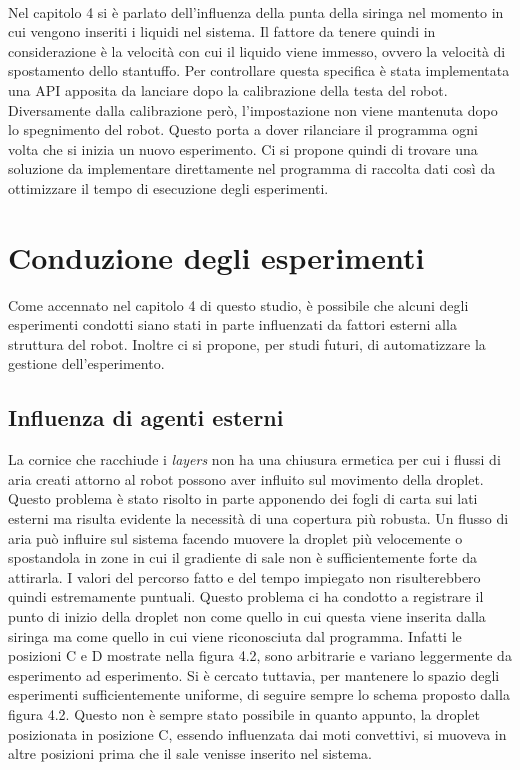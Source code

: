 \\Nel capitolo 4 si è parlato dell'influenza della punta della siringa nel momento in cui vengono inseriti i liquidi nel sistema. Il fattore da tenere quindi in considerazione è la velocità con cui il liquido viene immesso, ovvero la velocità di spostamento dello stantuffo. Per controllare questa specifica è stata implementata una API apposita da lanciare dopo la calibrazione della testa del robot. Diversamente dalla calibrazione però, l'impostazione non viene mantenuta dopo lo spegnimento del robot. Questo porta a dover rilanciare il programma ogni volta che si inizia un nuovo esperimento. Ci si propone quindi di trovare una soluzione da implementare direttamente nel programma di raccolta dati così da ottimizzare il tempo di esecuzione degli esperimenti.  

\section{Conduzione degli esperimenti}
\label{sec:123}
Come accennato nel capitolo 4 di questo studio, è possibile che alcuni degli esperimenti condotti siano stati in parte influenzati da fattori esterni alla struttura del robot. Inoltre ci si propone, per studi futuri, di automatizzare la gestione dell'esperimento.
 
\subsection{Influenza di agenti esterni} 
La cornice che racchiude i \emph{layers} non ha una chiusura ermetica per cui i flussi di aria creati attorno al robot possono aver influito sul movimento della droplet. Questo problema è stato risolto in parte apponendo dei fogli di carta sui lati esterni ma risulta evidente la necessità di una copertura più robusta. Un flusso di aria può influire sul sistema facendo muovere la droplet più velocemente o spostandola in zone in cui il gradiente di sale non è sufficientemente forte da attirarla. I valori del percorso fatto e del tempo impiegato non risulterebbero quindi estremamente puntuali. 
Questo problema ci ha condotto a registrare il punto di inizio della droplet non come quello in cui questa viene inserita dalla siringa ma come quello in cui viene riconosciuta dal programma.  
Infatti le posizioni C e D mostrate nella figura 4.2, sono arbitrarie e variano leggermente da esperimento ad esperimento. Si è cercato tuttavia, per mantenere lo spazio degli esperimenti sufficientemente uniforme, di seguire sempre lo schema proposto dalla figura 4.2. Questo non è sempre stato possibile in quanto appunto, la droplet posizionata in posizione C, essendo influenzata dai moti convettivi, si muoveva in altre posizioni prima che il sale venisse inserito nel sistema. 

